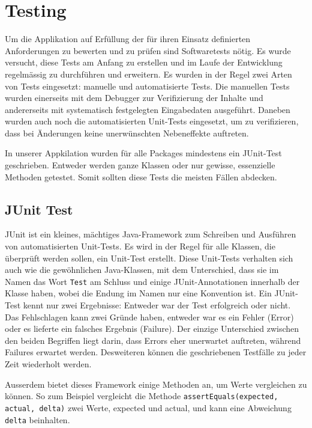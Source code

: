 \section{Testing}
Um die Applikation auf Erfüllung der für ihren Einsatz definierten
Anforderungen zu bewerten und zu prüfen sind Softwaretests nötig. Es wurde
versucht, diese Tests am Anfang zu erstellen und im Laufe der Entwicklung
regelmässig zu durchführen und erweitern. Es wurden in der Regel zwei Arten
von Tests eingesetzt: manuelle und automatisierte Tests. Die manuellen Tests
wurden einerseits mit dem Debugger zur Verifizierung der Inhalte und
andererseits mit systematisch festgelegten Eingabedaten ausgeführt. Daneben
wurden auch noch die automatisierten Unit-Tests eingesetzt, um zu
verifizieren, dass bei Änderungen keine unerwünschten Nebeneffekte
auftreten. 

In unserer Appkilation wurden für alle Packages mindestens ein JUnit-Test
geschrieben. Entweder werden ganze Klassen oder nur gewisse, essenzielle
Methoden getestet. Somit sollten diese Tests die meisten Fällen abdecken. 

\subsection{JUnit Test}
JUnit\cite{junitTest} ist ein kleines, mächtiges Java-Framework zum Schreiben und Ausführen
von automatisierten Unit-Tests. Es wird in der Regel für alle Klassen, die
überprüft werden sollen, ein Unit-Test erstellt. Diese Unit-Tests verhalten
sich auch wie die gewöhnlichen Java-Klassen, mit dem Unterschied, dass sie im
Namen das Wort \texttt{Test} am Schluss und einige JUnit-Annotationen innerhalb der
Klasse haben, wobei die Endung im Namen nur eine Konvention ist. Ein
JUnit-Test kennt nur zwei Ergebnisse: Entweder war der Test erfolgreich oder
nicht. Das Fehlschlagen kann zwei Gründe haben, entweder war es ein
Fehler (Error) oder es lieferte ein falsches Ergebnis (Failure). Der einzige
Unterschied zwischen den beiden Begriffen liegt darin, dass Errors eher
unerwartet auftreten, während Failures erwartet werden. Desweiteren können die
geschriebenen Testfälle zu jeder Zeit wiederholt werden. 

Ausserdem bietet dieses Framework einige Methoden an, um Werte vergleichen zu
können. So zum Beispiel vergleicht die Methode \texttt{assertEquals(expected, actual,
delta)} zwei Werte, expected und actual, und kann eine Abweichung
\texttt{delta} beinhalten. 

